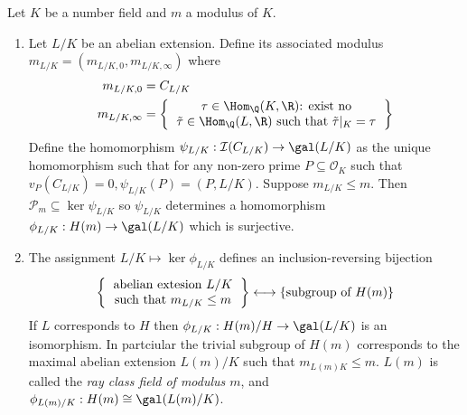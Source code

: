 \documentclass[a4paper]{article}
\renewcommand*{\O}{\mathcal{O}}
\begin{document}
\begin{theorem}
  Let \(K\) be a number field and \(m\) a modulus of \(K\).
  \begin{enumerate}
  \item Let \(L/K\) be an abelian extension. Define its associated modulus \(m_{L/K} = (m_{L/K, 0}, m_{L/K, \infty})\) where
    \begin{align*}
      m_{L/K, 0} &= C_{L/K} \\
      m_{L/K, \infty} &=
                        \left\{
                        \begin{tabular}{c}
                          \(\tau \in \Hom_\Q(K, \R)\): exist no \\
                          \(\tilde \tau \in \Hom_\Q(L, \R)\) such that \(\tilde \tau|_K = \tau\)
                        \end{tabular}
      \right\}
    \end{align*}
    Define the homomorphism \(\psi_{L/K}: \mathcal I(C_{L/K}) \to \gal(L/K)\) as the unique homomorphism such that for any non-zero prime \(P \subseteq \O_K\) such that \(v_P(C_{L/K}) = 0, \psi_{L/K}(P) = (P, L/K)\). Suppose \(m_{L/K} \leq m\). Then \(\mathcal P_m \subseteq \ker \psi_{L/K}\) so \(\psi_{L/K}\) determines a homomorphism \(\phi_{L/K}: H(m) \to \gal(L/K)\) which is surjective.
  \item The assignment \(L/K \mapsto \ker \phi_{L/K}\) defines an inclusion-reversing bijection
    \[
      \left\{
        \begin{tabular}{c}
          abelian extesion \(L/K\) \\
          such that \(m_{L/K} \leq m\)
        \end{tabular}
      \right\}
      \longleftrightarrow
      \{\text{subgroup of } H(m)\}
    \]
    If \(L\) corresponds to \(H\) then \(\phi_{L/K}: H(m)/H \to \gal(L/K)\) is an isomorphism. In partciular the trivial subgroup of \(H(m)\) corresponds to the maximal abelian extension \(L(m)/K\) such that \(m_{L(m)K} \leq m\). \(L(m)\) is called the \emph{ray class field of modulus \(m\)}, and \(\phi_{L(m)/K}: H(m) \cong \gal(L(m)/K)\).
  \end{enumerate}
\end{theorem}
\end{document}
